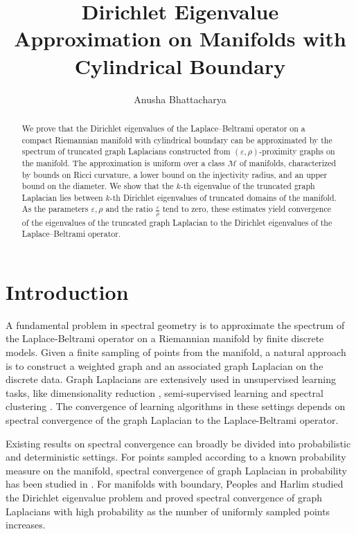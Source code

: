 \documentclass[10 pt, reqno]{amsart}
\theoremstyle{definition}
\numberwithin{equation}{section}
\begin{document}
\title{Dirichlet Eigenvalue Approximation on Manifolds with Cylindrical Boundary }
\author{Anusha Bhattacharya}
\address{Department of Mathematical Sciences, Indian Institute of Science Education and Research Mohali, \newline Sector 81, SAS Nagar, Punjab- 140306, India.}
\begin{abstract}
We prove that the Dirichlet eigenvalues of the Laplace–Beltrami operator on a compact Riemannian manifold with cylindrical boundary can be approximated by the spectrum of truncated graph Laplacians constructed from $(\varepsilon,\rho) $-proximity graphs on the manifold. The approximation is uniform over a class $\mathcal{M}$ of manifolds,  characterized by bounds on Ricci curvature, a lower bound on the injectivity radius, and an upper bound on the diameter. We show that the $k$-th  eigenvalue of the truncated graph Laplacian lies between  $k$-th Dirichlet eigenvalues of truncated domains of the manifold. As the parameters $\varepsilon, \rho$ and the ratio $\frac{\varepsilon}{\rho}$ tend to zero, these estimates yield convergence of the eigenvalues of the truncated graph Laplacian  to the Dirichlet eigenvalues of the Laplace–Beltrami operator. 

\end{abstract}
\maketitle
\section{Introduction}

A fundamental problem in spectral geometry is to approximate the spectrum of the Laplace-Beltrami operator on a Riemannian manifold by finite discrete models. Given a finite sampling of points from the manifold, a natural approach is to construct a weighted graph and an associated graph Laplacian on the discrete data. Graph Laplacians are extensively used in unsupervised learning tasks, like dimensionality reduction \cite{belkin2003, coifman},  semi-supervised learning \cite{Belkin2004, calder2020} and spectral clustering \cite{andrew, vonLuxburg2008}. The convergence of learning algorithms in these settings depends on spectral convergence of the graph Laplacian to the Laplace-Beltrami operator.

\par Existing results on spectral convergence can broadly be divided into probabilistic and deterministic settings. For points sampled according to a known probability measure on the manifold, spectral convergence of graph Laplacian in probability has been studied in \cite{NIPS2006_5848ad95, trillos2020}. For manifolds with boundary, Peoples and Harlim \cite{peoples} studied the Dirichlet eigenvalue problem and proved spectral convergence of graph Laplacians with high probability as the number of uniformly sampled points increases. 
\end{document}
